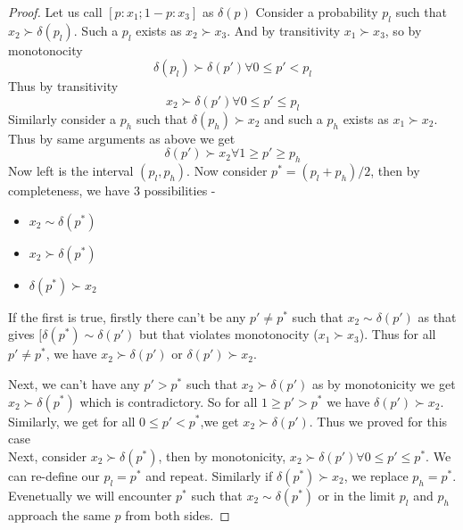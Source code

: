 \documentclass{article}
\theoremstyle{definition}
\begin{document}
\begin{proof}
Let us call $[p:x_1;1-p:x_3]$ as $\delta(p)$ Consider a probability $p_l$ such that $x_2 \succ \delta(p_l)$. Such a $p_l$ exists as $x_2\succ x_3$. And by transitivity $x_1\succ x_3$, so by monotonocity $$\delta(p_l) \succ \delta(p') \forall 0\leq p'<p_l$$ Thus by transitivity $$x_2 \succ \delta(p') \forall 0\leq p'\leq p_l$$
Similarly consider a $p_h$ such that $\delta(p_h)\succ x_2$ and such a $p_h$ exists as $x_1\succ x_2$. Thus by same arguments as above we get $$\delta(p')\succ x_2 \forall 1\geq p'\geq p_h$$
Now left is the interval $(p_l, p_h)$. Now consider $p^* = (p_l+p_h)/2$, then by completeness, we have 3 possibilities - 
\begin{itemize}
	\item $x_2 \sim \delta(p^*)$
	\item $x_2 \succ \delta(p^*)$
	\item $\delta(p^*) \succ x_2$
\end{itemize}
If the first is true, firstly there can't be any $p' \neq p^*$ such that $x_2 \sim \delta(p')$ as that gives $[\delta(p^*) \sim \delta(p')$ but that violates monotonocity ($x_1\succ x_3$). Thus for all $p' \neq p^*$, we have $x_2 \succ \delta(p')$ or $\delta(p') \succ x_2$.

Next, we can't have any $p' > p^*$ such that $x_2 \succ \delta(p')$ as by monotonicity we get $x_2 \succ \delta(p^*)$ which is contradictory. So for all $1\geq p' >p^*$ we have $\delta(p') \succ x_2$. Similarly, we get for all $0\leq p' < p^*$,we get $ x_2 \succ \delta(p')$. Thus we proved for this case\\

Next, consider $x_2 \succ \delta(p^*)$, then by monotonicity, $x_2 \succ \delta(p')\forall 0\leq p'\leq p^*$. We can re-define our $p_l = p^*$ and repeat. Similarly if $\delta(p^*) \succ x_2$, we replace $p_h = p^*$. Evenetually we will encounter $p^*$ such that $x_2\sim \delta(p^*)$ or in the limit $p_l$ and $p_h$ approach the same $p$ from both sides.  
\end{proof}
\end{document}
